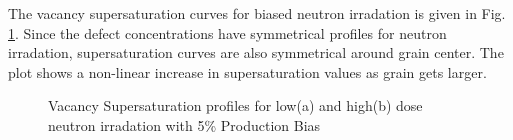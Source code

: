 \documentclass[a4paper]{article}
\begin{document}
    The vacancy supersaturation curves for biased neutron irradation is given in Fig. \ref{figure:vacancy_supersaturation_neutron_5}. Since the defect concentrations have symmetrical profiles for neutron irradation, supersaturation curves are also symmetrical around grain center. The plot shows a non-linear increase in supersaturation values as grain gets larger.
      \begin{figure}[h!]  %
        \centering
        \qquad
        \caption{Vacancy Supersaturation profiles for low(a) and high(b) dose neutron irradation with 5\% Production Bias}
        \label{figure:vacancy_supersaturation_neutron_5}
      \end{figure}
\end{document}
